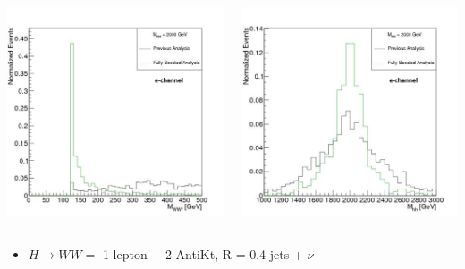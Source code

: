 \documentclass{beamer}
\newcommand*{\header}[1]{\fontsize{16}{8}\selectfont \textbf{{\color{MyPurple}{#1}}}}
\begin{document}
\begin{frame}
\begin{center}
\header{Signal Reconstruction}
\end{center}
\begin{columns}
\begin{column}{0.5\textwidth}
\includegraphics[width=01\textwidth]{figures/electron/mww_e}
\end{column}
\begin{column}{0.5\textwidth}
\includegraphics[width=01\textwidth]{figures/electron/mhh_e}
\end{column}
\end{columns}
\small \color{MyPurple}{Previous Analysis:}
\begin{itemize}
\scriptsize
\item $H\rightarrow{WW} = $ 1 lepton + 2 AntiKt, R = 0.4 jets + $\nu$
\end{itemize}
\end{frame}
\end{document}
